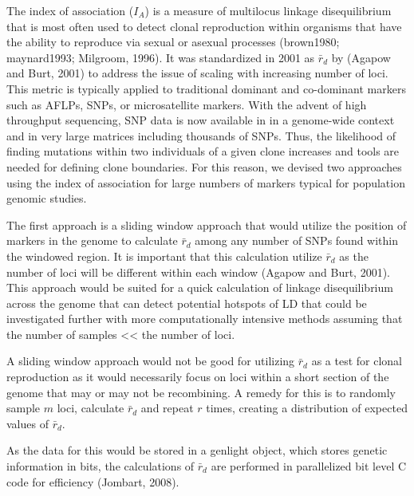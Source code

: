 \documentclass{frontiersSCNS} %
\begin{document}
The index of association (\(I_A\)) is a measure of multilocus linkage
disequilibrium that is most often used to detect clonal reproduction
within organisms that have the ability to reproduce via sexual or
asexual processes (brown1980; maynard1993; Milgroom, 1996). It was
standardized in 2001 as \(\bar{r}_d\) by (Agapow and Burt, 2001) to
address the issue of scaling with increasing number of loci. This metric
is typically applied to traditional dominant and co-dominant markers
such as AFLPs, SNPs, or microsatellite markers. With the advent of high
throughput sequencing, SNP data is now available in in a genome-wide
context and in very large matrices including thousands of SNPs. Thus,
the likelihood of finding mutations within two individuals of a given
clone increases and tools are needed for defining clone boundaries. For
this reason, we devised two approaches using the index of association
for large numbers of markers typical for population genomic studies.

The first approach is a sliding window approach that would utilize the
position of markers in the genome to calculate \(\bar{r}_d\) among any
number of SNPs found within the windowed region. It is important that
this calculation utilize \(\bar{r}_d\) as the number of loci will be
different within each window (Agapow and Burt, 2001). This approach
would be suited for a quick calculation of linkage disequilibrium across
the genome that can detect potential hotspots of LD that could be
investigated further with more computationally intensive methods
assuming that the number of samples \textless{}\textless{} the number of
loci.

A sliding window approach would not be good for utilizing \(\bar{r}_d\)
as a test for clonal reproduction as it would necessarily focus on loci
within a short section of the genome that may or may not be recombining.
A remedy for this is to randomly sample \(m\) loci, calculate
\(\bar{r}_d\) and repeat \(r\) times, creating a distribution of
expected values of \(\bar{r}_d\).

As the data for this would be stored in a genlight object, which stores
genetic information in bits, the calculations of \(\bar{r}_d\) are
performed in parallelized bit level C code for efficiency (Jombart,
2008).
\end{document}
